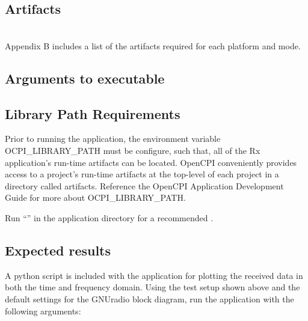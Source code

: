 \subsection{Artifacts}
\assetsdoc \\
\noindent Appendix B includes a list of the artifacts required for each platform and mode.
\subsection{Arguments to executable}
\assetsdoc
\subsection{Library Path Requirements}
\noindent Prior to running the application, the environment variable OCPI\_LIBRARY\_PATH must be configure, such that, all of the Rx application's run-time artifacts can be located. OpenCPI conveniently provides access to a project's run-time artifacts at the top-level of each project in a directory called artifacts. Reference the OpenCPI Application Development Guide for more about OCPI\_LIBRARY\_PATH. \par\medskip

\noindent Run ``'' in the application directory for a recommended .

\subsection{Expected results}
\noindent A python script is included with the application for plotting the received data in both the time and frequency domain. Using the test setup shown above and the default settings for the GNUradio block diagram, run the application with the following arguments:\par\medskip

\small

